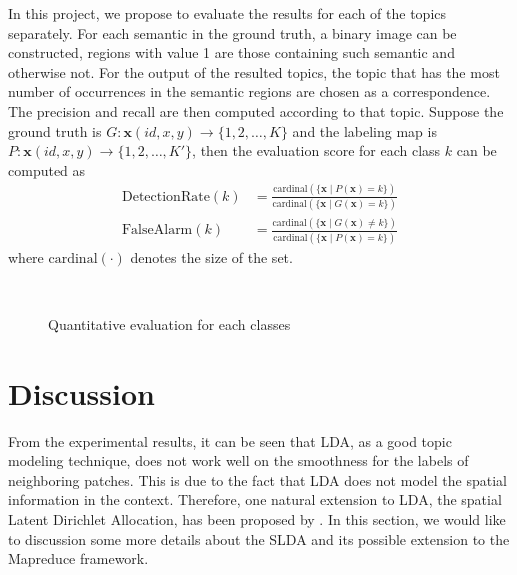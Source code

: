 \documentclass{acm_proc_article-sp}
\newcommand\mb\mathbf
\begin{document}
In this project, we propose to evaluate the results for each of the topics separately. For each semantic in the ground truth, a binary image can be constructed, regions with value 1 are those containing such semantic and otherwise not. For the output of the resulted topics, the topic that has the most number of occurrences in the semantic regions are chosen as a correspondence. The precision and recall are then computed according to that topic. Suppose the ground truth is $G:\mb{x}(id,x,y)\to\{1,2,\ldots,K\}$ and the labeling map is $P: \mb{x}(id,x,y)\to\{1,2,\ldots,K'\}$, then the evaluation score for each class $k$ can be computed as
\begin{align}
\text{DetectionRate}(k)&=\frac{\text{cardinal}\left(\{\mb{x}\mid P(\mb{x})=k\}\right)}{\text{cardinal}(\{\mb{x}\mid G(\mb{x})=k\})}\\
\text{FalseAlarm}(k)&=\frac{\text{cardinal}(\{\mb{x}\mid G(\mb{x})\not=k\})}{\text{cardinal}(\{ \mb{x}\mid P(\mb{x})=k\})}
\end{align}
where $\text{cardinal}(\cdot)$ denotes the size of the set.

\begin{figure}[!htb]
 \centering
 \\
 \caption{Quantitative evaluation for each classes}
\end{figure}

\section{Discussion}
From the experimental results, it can be seen that LDA, as a good topic modeling technique, does not work well on the smoothness for the labels of neighboring patches. This is due to the fact that LDA does not model the spatial information in the context. Therefore, one natural extension to LDA, the spatial Latent Dirichlet Allocation, has been proposed by \cite{DBLP:conf/nips/WangG07}. In this section, we would like to discussion some more details about the SLDA and its possible extension to the Mapreduce framework.
\end{document}
